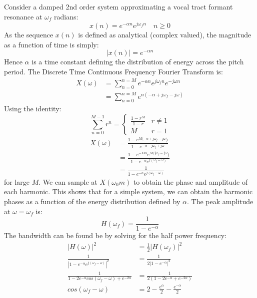 \documentclass{article}
\begin{document}
Consider a damped 2nd order system approximating a vocal tract formant resonance at $\omega_f$ radians:
\begin{equation}
x(n) = e^{-\alpha n}e^{j \omega_f n} \quad n \ge 0
\end{equation}
As the sequence $x(n)$ is defined as analytical (complex valued), the magnitude as a function of time is simply:
\begin{equation}
|x(n)| = e^{-\alpha n}
\end{equation}
Hence $\alpha$ is a time constant defining the distribution of energy across the pitch period.  The Discrete Time Continuous Frequency Fourier Transform is:
\begin{equation}
\begin{split}
X(\omega) &= \sum_{n=0}^{n=M} e^{-\alpha n}e^{j \omega_f n}e^{-j \omega n} \\
           &= \sum_{n=0}^{n=M} e^{n(-\alpha + j \omega_f - j \omega)}
\end{split}
\end{equation}
Using the identity:
\begin{equation}
\label{eq:geo_sum}
\sum_{n=0}^{M-1} r^n = 
\begin{cases}
  \frac{1-r^M}{1-r} & r \ne 1 \\
   M                & r = 1 
\end{cases}   
\end{equation}
\begin{equation}
\label{eq:sec_order}
\begin{split}
X(\omega) &= \frac{1 - e^{M(-\alpha + j \omega_f - j \omega})}{1 - e^{-\alpha - j \omega_f + j \omega}} \\
          &= \frac{1 - e^{-M \alpha}e^{M( j \omega_f - j \omega})}{1 - e^{-\alpha}e^{ j( \omega_f - \omega)}} \\
           &= \frac{1}{1 - e^{-\alpha}e^{j (\omega_f - \omega)}}
\end{split}
\end{equation}
for large $M$.  We can sample at $X(\omega_0 m)$ to obtain the phase and amplitude of each harmonic. This shows that for a simple system, we can obtain the harmonic phases as a function of the energy distribution defined by $\alpha$.  The peak amplitude at $\omega=\omega_f$ is:
\begin{equation}
H(\omega_f) = \frac{1}{1-e^{-\alpha}}	
\end{equation}
The bandwidth can be found be by solving for the half power frequency:
\begin{equation}
\begin{split}
|H(\omega)|^2 &= \frac{1}{2}|H(\omega_f)|^2 \\
\frac{1}{|1 - e^{-\alpha}e^{j (\omega_f - \omega)}|^2} &= \frac{1}{2|1-e^{-\alpha}|^2} \\
\frac{1}{1 - 2e^{-\alpha}cos(\omega_f - \omega) + e^{-2\alpha}} &= \frac{1}{2(1-2e^{-\alpha} + e^{-2 \alpha})} \\
cos(\omega_f - \omega) &= 2 - \frac{e^{\alpha}}{2} - \frac{e^{-\alpha}}{2}
\end{split}
\end{equation}
\end{document}
